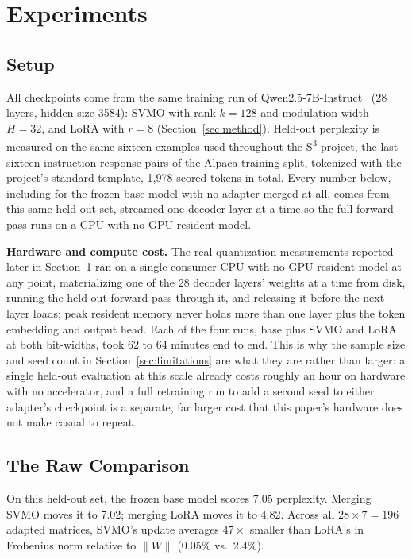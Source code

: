 \documentclass[conference]{IEEEtran}
\begin{document}
\section{Experiments}
\label{sec:results}

\subsection{Setup}

All checkpoints come from the same training run of Qwen2.5-7B-Instruct~\cite{qwen2.5} (28 layers, hidden size 3584): SVMO with rank $k=128$ and modulation width $H=32$, and LoRA with $r=8$ (Section~\ref{sec:method}). Held-out perplexity is measured on the same sixteen examples used throughout the S\textsuperscript{3} project, the last sixteen instruction-response pairs of the Alpaca training split, tokenized with the project's standard template, 1{,}978 scored tokens in total. Every number below, including for the frozen base model with no adapter merged at all, comes from this same held-out set, streamed one decoder layer at a time so the full forward pass runs on a CPU with no GPU resident model.

\textbf{Hardware and compute cost.} The real quantization measurements reported later in Section~\ref{sec:results} ran on a single consumer CPU with no GPU resident model at any point, materializing one of the 28 decoder layers' weights at a time from disk, running the held-out forward pass through it, and releasing it before the next layer loads; peak resident memory never holds more than one layer plus the token embedding and output head. Each of the four runs, base plus SVMO and LoRA at both bit-widths, took 62 to 64 minutes end to end. This is why the sample size and seed count in Section~\ref{sec:limitations} are what they are rather than larger: a single held-out evaluation at this scale already costs roughly an hour on hardware with no accelerator, and a full retraining run to add a second seed to either adapter's checkpoint is a separate, far larger cost that this paper's hardware does not make casual to repeat.

\subsection{The Raw Comparison}

On this held-out set, the frozen base model scores 7.05 perplexity. Merging SVMO moves it to 7.02; merging LoRA moves it to 4.82. Across all $28\times7=196$ adapted matrices, SVMO's update averages $47\times$ smaller than LoRA's in Frobenius norm relative to $\|W\|$ (0.05\% vs.\ 2.4\%).
\end{document}
